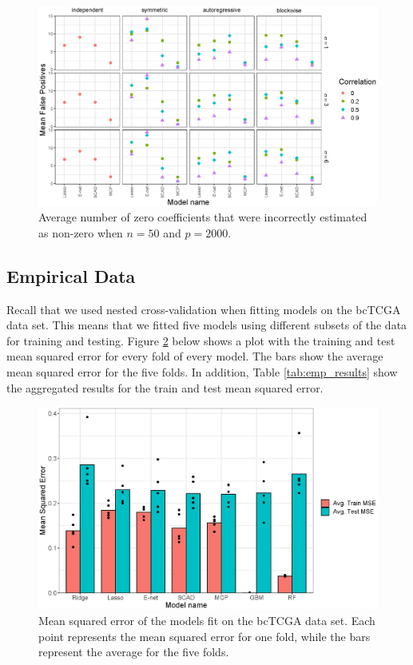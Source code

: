 \documentclass{article}
\begin{document}
\begin{figure}[h!]
	\centering
	\includegraphics[width = \textwidth]{images/facet-fp/facet_fp_50_2000.eps}
	\caption{Average number of zero coefficients that were incorrectly estimated as non-zero when $n = 50$ and $p = 2000$.}
	\label{fig:fp-50-2000}
\end{figure}

\subsection{Empirical Data}
Recall that we used nested cross-validation when fitting models on the bcTCGA data set. This means that we fitted five models using different subsets of the data for training and testing. Figure \ref{fig:empirical_mse} below shows a plot with the training and test mean squared error for every fold of every model. The bars show the average mean squared error for the five folds. In addition, Table \ref{tab:emp_results} show the aggregated results for the train and test mean squared error.

\begin{figure}[h!]
	\centering
	\includegraphics[width = 0.9\linewidth]{images/empirical_mse.eps}
	\captionsetup{width = 4in}
	\caption{Mean squared error of the models fit on the bcTCGA data set. Each point represents the mean squared error for one fold, while the bars represent the average for the five folds.}
	\label{fig:empirical_mse}
\end{figure}
\end{document}
